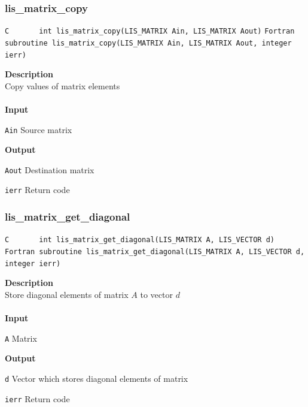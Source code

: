 \documentclass[a4paper]{article}
\newcommand{\namelistlabel}[1]{\mbox{#1}\hfill}
\newenvironment{namelist}[1]{%
 \begin{list}{}
  {\let\makelabel\namelistlabel
  \settowidth{\labelwidth}{#1}
  \setlength{\leftmargin}{1.1\labelwidth}}
}{%
\end{list}}
\begin{document}
  \subsubsection{lis\_matrix\_copy}
\begin{screen}
\verb|C       int lis_matrix_copy(LIS_MATRIX Ain, LIS_MATRIX Aout)|
\verb|Fortran subroutine lis_matrix_copy(LIS_MATRIX Ain, LIS_MATRIX Aout, integer ierr) |
\end{screen}
{\bf Description}\\
\indent
Copy values of matrix elements
\\ \\
\noindent
{\bf Input}
\begin{namelist}{XXXXXXXXXXXXXXXXXXXX}
\item[\tt Ain] Source matrix
\end{namelist}
{\bf Output}
\begin{namelist}{XXXXXXXXXXXXXXXXXXXX}
\item[\tt Aout] Destination matrix
\item[\tt ierr] Return code
\end{namelist}
  \subsubsection{lis\_matrix\_get\_diagonal}
\begin{screen}
\verb|C       int lis_matrix_get_diagonal(LIS_MATRIX A, LIS_VECTOR d)|\\
\verb|Fortran subroutine lis_matrix_get_diagonal(LIS_MATRIX A, LIS_VECTOR d, integer ierr) |
\end{screen}
{\bf Description}\\
\indent
Store diagonal elements of matrix $A$ to vector $d$
\\ \\
\noindent
{\bf Input}
\begin{namelist}{XXXXXXXXXXXXXXXXXXXX}
\item[\tt A] Matrix
\end{namelist}
{\bf Output}
\begin{namelist}{XXXXXXXXXXXXXXXXXXXX}
\item[\tt d] Vector which stores diagonal elements of matrix
\item[\tt ierr] Return code
\end{namelist}
\newpage
\end{document}
